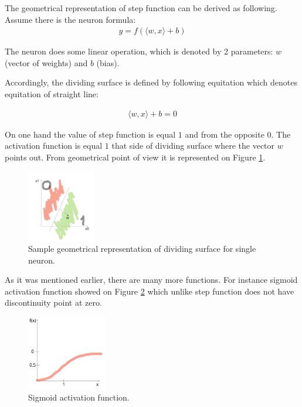 The geometrical representation of step function can be derived as following. Assume there is the neuron formula:
\begin{align*}
y = f(\langle w, x \rangle + b)
\end{align*}

The neuron does some linear operation, which is denoted by 2 parameters: $w$ (vector of weights) and $b$ (bias).

Accordingly, the dividing surface is defined by following equitation which denotes equitation of straight line:

\begin{align*}
\langle w, x \rangle + b = 0
\end{align*}

On one hand the value of step function is equal $1$ and from the opposite $0$. The activation function is equal $1$ that side of dividing surface where the vector $w$ points out. From geometrical point of view it is represented on Figure \ref{fig:dividing_surface}.  

\begin{figure}[h]
    \centering \includegraphics[width=3cm]{images/dividing_surface.jpg}
    \caption {Sample geometrical representation of dividing surface for single neuron.}
    \label{fig:dividing_surface}
\end{figure}

As it was mentioned earlier, there are many more functions. For instance sigmoid activation function showed on Figure \ref{fig:sigmoid} which unlike step function does not have discontinuity point at zero. 

\begin{figure}[h]
    \centering \includegraphics[width=3.5cm]{images/sigmoid_function.jpg}
    \caption {Sigmoid activation function.}
    \label{fig:sigmoid}
\end{figure}

